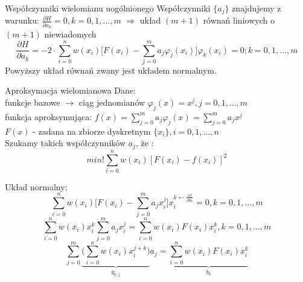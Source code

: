 \begin{frame}{Współczynniki wielomianu uogólnionego}
    Współczynniki $\{a_j\}$ znajdujemy z warunku: $\frac{\partial H}{\partial a_k} = 0, k=0,1,\ldots,m$
    $\Rightarrow$ układ $(m+1)$ równań liniowych o $(m+1)$ niewiadomych
    $$\frac{\partial H}{\partial a_k} = -2 \cdot \sum_{i=0}^{n}w(x_i)\bigg[F(x_i)-\sum_{j=0}^{m}a_j\varphi_j(x_i)\bigg]\varphi_k(x_i)=0;k=0,1,\ldots,m$$
   Powyższy układ równań zwany jest układem normalnym.
\end{frame}
\begin{frame}{Aproksymacja wielomianowa}
	Dane:\\
	
	funkcje bazowe $\rightarrow$ ciąg jednomianów $\varphi_j(x) = x^j,j=0,1,\ldots,m$\\
	\vspace{0.5cm}
    funkcja aproksymująca: $f(x) = \sum_{j=0}^{m}a_j\varphi_j(x)=\sum_{j=0}^{m}a_jx^j$ \\
    \vspace{0.5cm}
    $F(x)$ - zadana na zbiorze dyskretnym $\{x_i\},i=0,1,\ldots,n$\\
    \vspace{0.5cm}
    Szukamy takich współczynników $a_j$, że :\\
    $$min!\sum_{i=0}^{n}w(x_i)[F(x_i)-f(x_i)]^2 $$
\end{frame}
\begin{frame}
    Układ normalny:
    $$\sum_{i=0}^{n}w(x_i)\bigg[F(x_i)-\sum_{j=0}^{m}a_jx_i^j\bigg]x_i^{k\leftarrow\frac{\partial f}{\partial a_k}}=0,k=0,1,\ldots,m$$
    $$\sum_{i=0}^{n}w(x_i)x_i^k\sum_{j=0}^{m}a_jx_i^j=\sum_{i=0}^{n}w(x_i)F(x_i)x_i^k,k=0,1,\ldots,m$$
    $$\sum_{j=0}^{m}\underbrace{\bigg(\sum_{i=0}^{n}w(x_i)x_i^{j+k}\bigg)}_{g_{k,j}}a_j = \underbrace{\sum_{i=0}^{n}w(x_i)F(x_i)x_i^k}_{b_k}$$
\end{frame}
